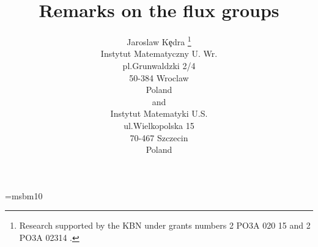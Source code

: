 %

 \newtheorem{Thm}{Theorem}[section]
 \newtheorem{Cor}[Thm]{Corollary}
 \newtheorem{Lem}[Thm]{Lemma}
 \newtheorem{Prop}[Thm]{Proposition}
 \newtheorem{Def}[Thm]{Definition}
 \newtheorem{Ex}[Thm]{Example}
 \newtheorem{Rem}[Thm]{Remark}
 
 \newcommand{\al}{\alpha}
 \newcommand{\be}{\beta}
 \newcommand{\ch}{\chi}
 \newcommand{\de}{\delta}
 \newcommand{\ep}{\varepsilon}
 \newcommand{\vfi}{\varphi}
 \newcommand{\ga}{\gamma}
 \newcommand{\io}{\iota}
 \newcommand{\th}{\theta}
 \newcommand{\ka}{\kappa}
 \newcommand{\la}{\lambda}
 \newcommand{\om}{\omega}
 \newcommand{\ro}{\varrho}
 \newcommand{\si}{\sigma}
 \newcommand{\ta}{\tau}
 \newcommand{\ups}{\upsilon}
 \newcommand{\ps}{\psi}
 \newcommand{\ze}{\zeta}

 \newcommand{\Ga}{\Gamma}
 \newcommand{\De}{\Delta}
 \newcommand{\Fi}{\Phi}
 \newcommand{\La}{\Lambda}
 \newcommand{\Om}{\Omega}
 \newcommand{\Ps}{\Psi}
 \newcommand{\Th}{\Theta}
 \newcommand{\Si}{\Sigma}
 \newcommand{\Ups}{\Upsilon}


 \newcommand{\co}{\subset}
 \newcommand{\ce}{\subseteq}
 \newcommand{\oc}{\supset}
 \newcommand{\ec}{\supseteq}
 
 
 
 \font\msbm=msbm10
 \def\B#1{\hbox{\msbm #1}}
 \def\map#1{\stackrel {#1}\longrightarrow}
 \def\pam#1{\stackrel {#1}\longleftarrow}
 \def\umap#1{\uparrow #1}
 \def\dmap#1{\downarrow #1}

 \newcommand{\set}[1]{ \{ #1 \} }%
 \newcommand{\C}[1]{{\cal#1}}%
 \newcommand{\F}[1]{{\frak#1}}%

 \newcommand{\n}{\left}
 \newcommand{\r}{\right} 
 \newcommand{\Mo}{(M,\om)}
 \newcommand{\Sym}{Symp(M,\om)}
 \newcommand{\Symo}{Symp_0\Mo}
 \newcommand{\Ham}{Ham\Mo}
 \newcommand{\pid}{\pi _1(Diff(M))}
 \newcommand{\pis}{\pi _1(\Symo)}
 \newcommand{\pih}{\pi _1(\Ham)}
 \newcommand{\dk}{\partial _\xi}
 \newcommand{\Po}{(P_{\xi },\Om)}
 \newcommand{\qed}{$\Box$}
 


  \title{Remarks on the flux groups}
  \author{Jaroslaw K\c{e}dra  
          \thanks {Research supported by the KBN under grants numbers 
          2 PO3A 020 15 and  2 PO3A 02314 .} 
\bigskip \\
%          
           Instytut Matematyczny U. Wr.\\
           pl.Grunwaldzki 2/4\\
           50-384 Wroclaw\\
           Poland\\
           and \\
           Instytut Matematyki U.S.\\
           ul.Wielkopolska 15\\
           70-467 Szczecin\\
           Poland} 

